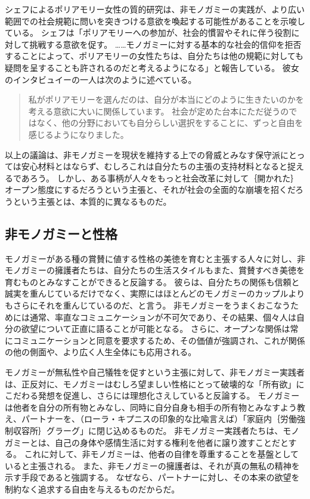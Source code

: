 \documentclass[paper=a4,book,openany]{jlreq}
\begin{document}
シェフによるポリアモリー女性の質的研究は、非モノガミーの実践が、より広い範囲での社会規範に問いを突きつける意欲を喚起する可能性があることを示唆している。
シェフは「ポリアモリーへの参加が、社会的慣習やそれに伴う役割に対して挑戦する意欲を促す。
……モノガミーに対する基本的な社会的信仰を拒否することによって、ポリアモリーの女性たちは、自分たちは他の規範に対しても疑問を呈することも許されるのだと考えるようになる」と報告している。
彼女のインタビュイーの一人は次のように述べている。

\begin{quote}
  私がポリアモリーを選んだのは、自分が本当にどのように生きたいのかを考える意欲に大いに関係しています。
社会が定めた台本にただ従うのではなく、他の分野においても自分らしい選択をすることに、ずっと自由を感じるようになりました。
\citep[pp.9--10]{sheff05:_polyam_women_sexual_subjec_power}

\end{quote}

以上の議論は、非モノガミーを現状を維持する上での脅威とみなす保守派にとっては安心材料とはならず、むしろこれは自分たちの主張の支持材料となると捉えるであろう。
しかし、ある事柄が人々をもっと社会改革に対して｛開かれた｝{オープン}態度にするだろうという主張と、それが社会の全面的な崩壊を招くだろうという主張とは、本質的に異なるものだ。

\subsection{非モノガミーと性格}

モノガミーがある種の賞賛に値する性格の美徳を育むと主張する人々に対し、非モノガミーの擁護者たちは、自分たちの生活スタイルもまた、賞賛すべき美徳を育むものとみなすことができると反論する。
彼らは、自分たちの関係も信頼と誠実を重んじているだけでなく、実際にはほとんどのモノガミーのカップルよりもさらにそれを重んじているのだ、と言う。
非モノガミーをうまくおこなうためには通常、率直なコミュニケーションが不可欠であり、その結果、個々人は自分の欲望について正直に語ることが可能となる。
さらに、オープンな関係は常にコミュニケーションと同意を要求するため、その価値が強調され、これが関係の他の側面や、より広く人生全体にも応用される。

モノガミーが無私性や自己犠牲を促すという主張に対して、非モノガミー実践者は、正反対に、モノガミーはむしろ望ましい性格にとって破壊的な「所有欲」にこだわる発想を促進し、さらには理想化さえしていると反論する。
モノガミーは他者を自分の所有物とみなし、同時に自分自身も相手の所有物とみなすよう教え、パートナーを、（ローラ・キプニスの印象的な比喩言えば）「家庭内｛労働強制収容所｝{グラーグ}」に閉じ込めるものだ。
非モノガミー実践者たちは、モノガミーとは、自己の身体や感情生活に対する権利を他者に譲り渡すことだとする。
これに対して、非モノガミーは、他者の自律を尊重することを基盤としていると主張される。
また、非モノガミーの擁護者は、それが真の無私の精神を示す手段であると強調する。
なぜなら、パートナーに対し、その本来の欲望を制約なく追求する自由を与えるものだからだ。
\end{document}
